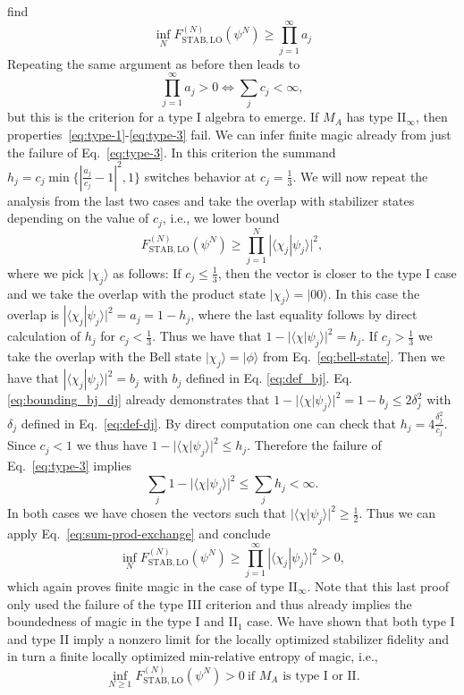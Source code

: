 \documentclass[aps,pra,reprint,superscriptaddress]{revtex4-2}
\renewcommand\c{\chi}
\renewcommand\d{\delta}
\providecommand{\ket}[1]{\lvert #1\rangle}
\theoremstyle{definition}
\theoremstyle{remark}
\begin{document}
find 
\begin{equation}
    \inf_{N} F_{\mathrm{STAB},\mathrm{LO}}^{(N)}(\psi^N) \geq \prod_{j=1}^{\infty} a_j
\end{equation}
Repeating the same argument as before then leads to
\begin{equation}
    \prod_{j=1}^{\infty} a_j > 0 \Leftrightarrow \sum_j c_j < \infty,
\end{equation}
but this is the criterion for a type I algebra to emerge. 
If $M_A$ has type II$_\infty$, then properties~\eqref{eq:type-1}-\eqref{eq:type-3} fail. We can infer finite magic already from just the failure of Eq.~\eqref{eq:type-3}. In this criterion the summand $h_j = c_j \min\{|\frac{a_j}{c_j}-1|^2,1\}$ switches behavior at $c_j = \frac{1}{3}$. We will now repeat the analysis from the last two cases and take the overlap with stabilizer states depending on the value of $c_j$, i.e., we lower bound 
\begin{equation}
F_{\mathrm{STAB},\mathrm{LO}}^{(N)}(\psi^N) \geq \prod_{j = 1}^N |\langle \c_j |\psi_j \rangle|^2,
\end{equation}
where we pick $\ket{\c_j}$ as follows: If $c_j\leq\frac{1}{3}$, then the vector is closer to the type I case and we take the overlap with the product state $\ket{\c_j} = \ket{00}$. In this case the overlap is $|\langle \c_j | \psi_j\rangle |^2= a_j = 1-h_j$, where the last equality follows by direct calculation of $h_j$ for $c_j < \frac{1}{3}$. Thus we have that $1-|\langle \c | \psi_j\rangle |^2 = h_j$.
If $c_j > \frac{1}{3}$ we take the overlap with the Bell state $\ket{\c_j} = \ket{\phi}$ from Eq.~\eqref{eq:bell-state}. Then we have that $|\langle \c_j | \psi_j\rangle|^2 = b_j$ with $b_j$ defined in Eq. \eqref{eq:def_bj}. Eq. \eqref{eq:bounding_bj_dj} already demonstrates that $1-|\langle \c | \psi_j\rangle |^2  = 1-b_j \leq 2 \d_j^2$ with $\d_j$ defined in Eq.~\eqref{eq:def-dj}. By direct computation one can check that $h_j = 4 \frac{\d_j^2}{c_j}$. Since $c_j < 1$ we thus have $1-|\langle \c | \psi_j\rangle |^2 \leq h_j$. 
Therefore the failure of Eq.~\eqref{eq:type-3} implies 
\begin{equation}
    \sum_j 1-|\langle \c | \psi_j\rangle |^2 \leq \sum_j h_j < \infty.
\end{equation}
In both cases we have chosen the vectors such that $|\langle \c | \psi_j\rangle |^2 \geq \frac{1}{2}$. Thus we can apply Eq.~\eqref{eq:sum-prod-exchange} and conclude
\begin{equation}
     \inf_{N} F_{\mathrm{STAB},\mathrm{LO}}^{(N)}(\psi^N) \geq \prod_{j = 1}^\infty |\langle \c_j |\psi_j \rangle|^2 > 0,
\end{equation}
which again proves finite magic in the case of type II$_\infty$. Note that this last proof only used the failure of the type III criterion and thus already implies the boundedness of magic in the type I and II$_1$ case.
We have shown that both type I and type II imply a nonzero limit for the locally optimized stabilizer fidelity and in turn a finite locally optimized min-relative entropy of magic, i.e., 
\begin{equation}
    \inf_{N\geq 1} F_{\mathrm{STAB},\mathrm{LO}}^{(N)}(\psi^N)>0 \ \text{if }M_A\text{ is type I or II.}
\end{equation}
\end{document}
